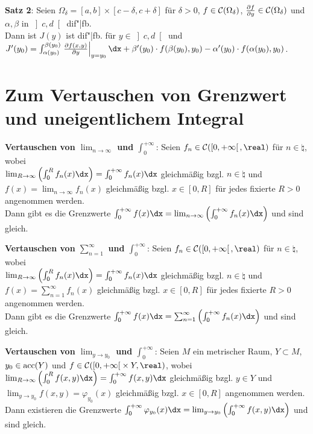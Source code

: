 \textbf{Satz 2}: Seien $\Omega_\delta = [a,b] \times [c - \delta, c + \delta]$
für $\delta > 0$, $f \in \mathcal{C}(\Omega_\delta)$,
$\frac{\partial f}{\partial y} \in \mathcal{C}(\Omega_\delta)$
und $\alpha, \beta$ in $\left]c,d\right[$ dif"|fb. \\
Dann ist $J(y)$ ist dif"|fb. für $y \in \left]c,d\right[$ und \\
$J'(y_0) = \int_{\alpha(y_0)}^{\beta(y_0)}
\left.\frac{\partial f(x, y)}{\partial y}\right|_{y = y_0}\dx +
\beta'(y_0) \cdot f(\beta(y_0), y_0) - \alpha'(y_0) \cdot f(\alpha(y_0), y_0)$.

\section{%
    Zum Vertauschen von Grenzwert und uneigentlichem Integral%
}

\textbf{Vertauschen von $\lim_{n \to \infty}$ und $\int_0^{+\infty}$}:
Seien $f_n \in \C(\left[0,+\infty\right[, \real)$ für $n \in \natural$,
wobei \\
$\lim_{R \to \infty} \left(\int_0^R f_n(x)\dx\right) =
\int_0^{+\infty} f_n(x)\dx$ gleichmäßig bzgl. $n \in \natural$ und \\
$f(x) = \lim_{n \to \infty} f_n(x)$ gleichmäßig bzgl. $x \in [0,R]$
für jedes fixierte $R > 0$ angenommen werden. \\
Dann gibt es die Grenzwerte
$\int_0^{+\infty} f(x)\dx =
\lim_{n \to \infty} \left(\int_0^{+\infty} f_n(x)\dx\right)$
und sind gleich.

\textbf{Vertauschen von $\sum_{n=1}^\infty$ und $\int_0^{+\infty}$}:
Seien $f_n \in \C(\left[0,+\infty\right[, \real)$ für $n \in \natural$,
wobei \\
$\lim_{R \to \infty} \left(\int_0^R f_n(x)\dx\right) =
\int_0^{+\infty} f_n(x)\dx$ gleichmäßig bzgl. $n \in \natural$ und \\
$f(x) = \sum_{n=1}^\infty f_n(x)$ gleichmäßig bzgl. $x \in [0,R]$
für jedes fixierte $R > 0$ angenommen werden. \\
Dann gibt es die Grenzwerte
$\int_0^{+\infty} f(x)\dx =
\sum_{n=1}^\infty \left(\int_0^{+\infty} f_n(x)\dx\right)$
und sind gleich.

\textbf{Vertauschen von $\lim_{y \to y_0}$ und $\int_0^{+\infty}$}:
Seien $M$ ein metrischer Raum, $Y \subset M$, $y_0 \in \operatorname{acc}(Y)$ und
$f \in \C(\left[0, +\infty\right[ \times Y, \real)$, wobei \\
$\lim_{R \to \infty} \left(\int_0^R f(x,y)\dx\right) =
\int_0^{+\infty} f(x,y)\dx$ gleichmäßig bzgl. $y \in Y$ und \\
$\lim_{y \to y_0} f(x,y) = \varphi_{y_0}(x)$ gleichmäßig bzgl. $x \in [0,R]$
angenommen werden. \\
Dann existieren die Grenzwerte
$\int_0^{+\infty} \varphi_{y_0}(x)\dx =
\lim_{y \to y_0} \left(\int_0^{+\infty} f(x,y)\dx\right)$ und sind gleich.

